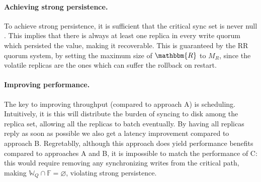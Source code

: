 \paragraph{Achieving strong persistence.} To achieve strong
persistence, it is sufficient that the critical sync set is
never null . This implies that there is always at least one
replica in every write quorum which persisted the value, making
it recoverable. This is guaranteed by the \ac{RR} quorum
system, by setting the maximum size of $\mathbbm{R}$ to $M_R$,
since the volatile replicas are the ones which can suffer the rollback on
restart.

\paragraph{Improving performance.}The key to improving throughput
(compared to approach A) is scheduling. Intuitively, it is
this will distribute the burden of syncing to disk among the
replica set, allowing all the replicas to batch eventually. By
having all replicas reply as soon as possible we also get a
latency improvement compared to approach B. Regretablly, although
this approach does yield performance benefits compared to
approaches A and B, it is impossible to match the performance of
C\@: this would require removing any synchronizing writes from the
critical path, making $\mathbb{W}_Q \cap \mathbb{F} =
\varnothing$, violating strong persistence.



